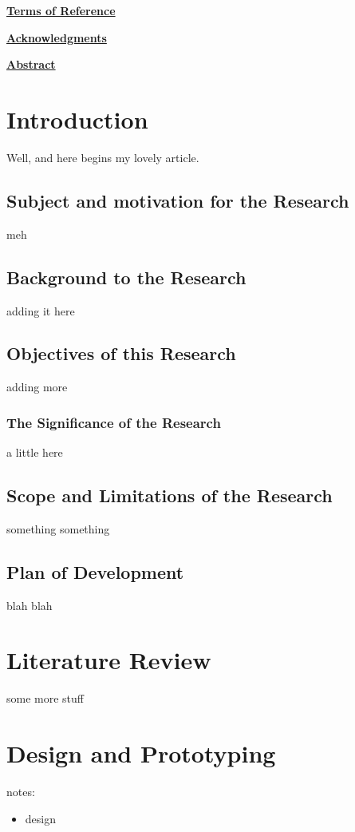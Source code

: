 \documentclass[a4paper,11pt]{article}
\begin{document}
	\mbox{}
	\thispagestyle{empty}
	\newpage	
	
	
	{\centering\Huge\bfseries\underline{Terms of Reference}\par}
	\newpage
	
	{\centering\Huge\bfseries\underline{Acknowledgments}\par}
	\newpage
	
	\mbox{}
	\newpage
	
	{\centering\Huge\bfseries\underline{Abstract}\par}
	\newpage	
	
	\tableofcontents
	\newpage
		
	\listoffigures
	\newpage
 
	\listoftables
	\newpage
	
	\newpage
	\newpage
	
\section{Introduction}
	Well, and here begins my lovely article.
	\subsection{Subject and motivation for the Research}
		meh
	\subsection{Background to the Research}
		adding it here
	\subsection{ Objectives of this Research}
		adding more
		\subsubsection{The Significance of the Research}
			a little here
	\subsection{Scope and Limitations of the Research}
		something something	
	\subsection{Plan of Development}	
		blah blah
	\newpage

\section{Literature Review}
	some more stuff
	\newpage
	
\section{Design and Prototyping}
	notes:
\begin{itemize}
	\item design
\end{itemize}
	\newpage


\end{document}
